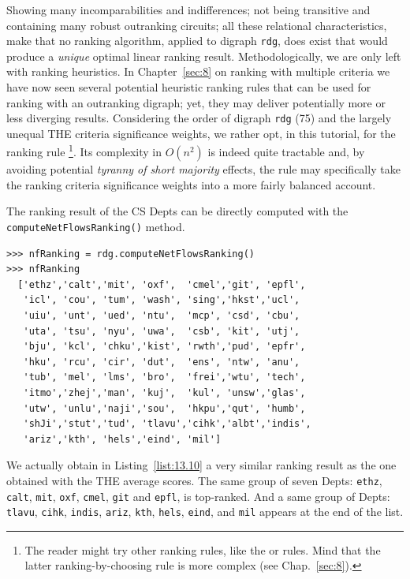 Showing many incomparabilities and indifferences; not being transitive and containing many robust outranking circuits; all these relational characteristics, make that no ranking algorithm, applied to digraph \texttt{rdg}, does exist that would produce a \emph{unique} optimal linear ranking result. Methodologically, we are only left with ranking heuristics. In Chapter~\ref{sec:8} on ranking with multiple criteria we have now seen several potential heuristic ranking rules that can be used for ranking with an outranking digraph; yet, they may deliver potentially more or less diverging results. Considering the order of digraph \texttt{rdg} (75) and the largely unequal THE criteria significance weights, we rather opt, in this tutorial, for the \NetFlows ranking rule \footnote{The reader might try other ranking rules, like the \Copeland or \Kohler rules. Mind that the latter ranking-by-choosing rule is more complex (see Chap.~\ref{sec:8}).}. Its complexity in $O(n^2)$ is indeed quite tractable and, by avoiding potential \emph{tyranny of short majority} effects, the \NetFlows rule may specifically take the ranking criteria significance weights into a more fairly balanced account.

The \NetFlows ranking result of the CS Depts can be directly computed with the \texttt{computeNetFlowsRanking()} method. 
\begin{lstlisting}[caption={Computing a robust \NetFlows ranking},label=list:13.10]
>>> nfRanking = rdg.computeNetFlowsRanking()
>>> nfRanking
  ['ethz','calt','mit', 'oxf',  'cmel','git', 'epfl',
   'icl', 'cou', 'tum', 'wash', 'sing','hkst','ucl',
   'uiu', 'unt', 'ued', 'ntu',  'mcp', 'csd', 'cbu',
   'uta', 'tsu', 'nyu', 'uwa',  'csb', 'kit', 'utj',
   'bju', 'kcl', 'chku','kist', 'rwth','pud', 'epfr',
   'hku', 'rcu', 'cir', 'dut',  'ens', 'ntw', 'anu',
   'tub', 'mel', 'lms', 'bro',  'frei','wtu', 'tech',
   'itmo','zhej','man', 'kuj',  'kul', 'unsw','glas',
   'utw', 'unlu','naji','sou',  'hkpu','qut', 'humb',
   'shJi','stut','tud', 'tlavu','cihk','albt','indis',
   'ariz','kth', 'hels','eind', 'mil']
\end{lstlisting}

We actually obtain in Listing~\vref{list:13.10} a very similar ranking result as the one obtained with the THE average scores. The same group of seven Depts: \texttt{ethz}, \texttt{calt}, \texttt{mit}, \texttt{oxf}, \texttt{cmel}, \texttt{git} and \texttt{epfl}, is top-ranked. And a same group of Depts: \texttt{tlavu}, \texttt{cihk}, \texttt{indis}, \texttt{ariz}, \texttt{kth}, \texttt{hels}, \texttt{eind}, and \texttt{mil} appears at the end of the list.

